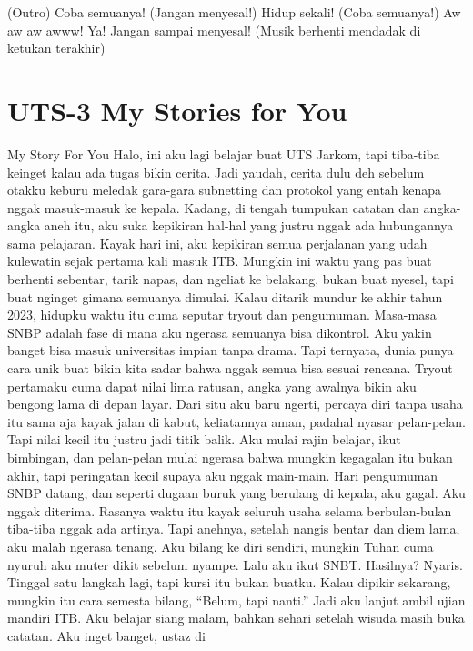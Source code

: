 \documentclass[
  letterpaper,
  DIV=11,
  numbers=noendperiod]{scrreprt}
\begin{document}
(Outro) Coba semuanya! (Jangan menyesal!) Hidup sekali! (Coba semuanya!)
Aw aw aw awww! Ya! Jangan sampai menyesal! (Musik berhenti mendadak di
ketukan terakhir)


\chapter{UTS-3 My Stories for You}\label{uts-3-my-stories-for-you}

My Story For You Halo, ini aku lagi belajar buat UTS Jarkom, tapi
tiba-tiba keinget kalau ada tugas bikin cerita. Jadi yaudah, cerita dulu
deh sebelum otakku keburu meledak gara-gara subnetting dan protokol yang
entah kenapa nggak masuk-masuk ke kepala. Kadang, di tengah tumpukan
catatan dan angka-angka aneh itu, aku suka kepikiran hal-hal yang justru
nggak ada hubungannya sama pelajaran. Kayak hari ini, aku kepikiran
semua perjalanan yang udah kulewatin sejak pertama kali masuk ITB.
Mungkin ini waktu yang pas buat berhenti sebentar, tarik napas, dan
ngeliat ke belakang, bukan buat nyesel, tapi buat nginget gimana
semuanya dimulai. Kalau ditarik mundur ke akhir tahun 2023, hidupku
waktu itu cuma seputar tryout dan pengumuman. Masa-masa SNBP adalah fase
di mana aku ngerasa semuanya bisa dikontrol. Aku yakin banget bisa masuk
universitas impian tanpa drama. Tapi ternyata, dunia punya cara unik
buat bikin kita sadar bahwa nggak semua bisa sesuai rencana. Tryout
pertamaku cuma dapat nilai lima ratusan, angka yang awalnya bikin aku
bengong lama di depan layar. Dari situ aku baru ngerti, percaya diri
tanpa usaha itu sama aja kayak jalan di kabut, keliatannya aman, padahal
nyasar pelan-pelan. Tapi nilai kecil itu justru jadi titik balik. Aku
mulai rajin belajar, ikut bimbingan, dan pelan-pelan mulai ngerasa bahwa
mungkin kegagalan itu bukan akhir, tapi peringatan kecil supaya aku
nggak main-main. Hari pengumuman SNBP datang, dan seperti dugaan buruk
yang berulang di kepala, aku gagal. Aku nggak diterima. Rasanya waktu
itu kayak seluruh usaha selama berbulan-bulan tiba-tiba nggak ada
artinya. Tapi anehnya, setelah nangis bentar dan diem lama, aku malah
ngerasa tenang. Aku bilang ke diri sendiri, mungkin Tuhan cuma nyuruh
aku muter dikit sebelum nyampe. Lalu aku ikut SNBT. Hasilnya? Nyaris.
Tinggal satu langkah lagi, tapi kursi itu bukan buatku. Kalau dipikir
sekarang, mungkin itu cara semesta bilang, ``Belum, tapi nanti.'' Jadi
aku lanjut ambil ujian mandiri ITB. Aku belajar siang malam, bahkan
sehari setelah wisuda masih buka catatan. Aku inget banget, ustaz di
\end{document}
